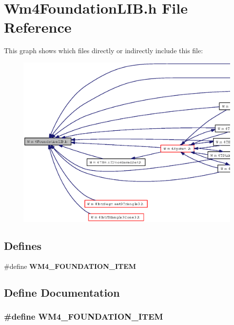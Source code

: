 \section{Wm4Foundation\-LIB.h File Reference}
\label{Wm4FoundationLIB_8h}


This graph shows which files directly or indirectly include this file:\begin{figure}[H]
\begin{center}
\leavevmode
\includegraphics[width=420pt]{Wm4FoundationLIB_8h__dep__incl}
\end{center}
\end{figure}
\subsection*{Defines}
\begin{CompactItemize}
\item 
\#define {\bf WM4\_\-FOUNDATION\_\-ITEM}
\end{CompactItemize}


\subsection{Define Documentation}
\subsubsection{\setlength{\rightskip}{0pt plus 5cm}\#define WM4\_\-FOUNDATION\_\-ITEM}\label{Wm4FoundationLIB_8h_caf6123c72a2bb1a617ec452404a5e8f}


